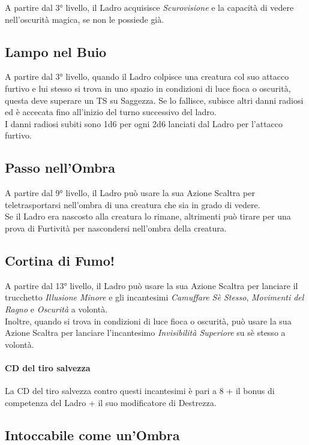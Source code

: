 A partire dal 3° livello, il Ladro acquisisce \textit{Scurovisione} e la capacità di vedere nell'oscurità magica, se non le possiede già.

\subsection{Lampo nel Buio}

A partire dal 3° livello, quando il Ladro colpisce una creatura col suo attacco furtivo e lui stesso si trova in uno spazio in condizioni di luce fioca o oscurità, questa deve superare un TS su Saggezza. Se lo fallisce, subisce altri danni radiosi ed è accecata fino all'inizio del turno successivo del ladro. \\ I danni radiosi subiti sono 1d6 per ogni 2d6 lanciati dal Ladro per l'attacco furtivo.

\subsection{Passo nell'Ombra}

A partire dal 9° livello, il Ladro può usare la sua Azione Scaltra per teletrasportarsi nell'ombra di una creatura che sia in grado di vedere. \\ Se il Ladro era nascosto alla creatura lo rimane, altrimenti può tirare per una prova di Furtività per nascondersi nell'ombra della creatura.

\subsection{Cortina di Fumo!}

A partire dal 13° livello, il Ladro può usare la sua Azione Scaltra per lanciare il trucchetto \textit{Illusione Minore} e gli incantesimi \textit{Camuffare Sè Stesso}, \textit{Movimenti del Ragno} e \textit{Oscurità} a volontà. \\ Inoltre, quando si trova in condizioni di luce fioca o oscurità, può usare la sua Azione Scaltra per lanciare l'incantesimo \textit{Invisibilità Superiore} su sè stesso a volontà.
\paragraph{CD del tiro salvezza}La CD del tiro salvezza contro questi incantesimi è pari a 8 + il bonus di competenza del Ladro + il suo modificatore di Destrezza.

\subsection{Intoccabile come un'Ombra}

